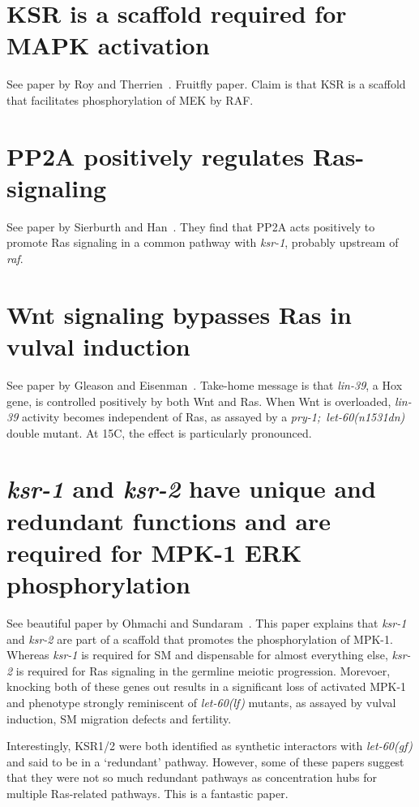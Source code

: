 \documentclass[10pt, onecolumn]{article}
\newcommand{\gene}[1]{\mbox{\emph{#1}}}
\newcommand{\letgf}{\gene{let-60(gf)}}
\newcommand{\letlf}{\gene{let-60(lf)}}
\begin{document}
\section*{KSR is a scaffold required for MAPK activation}
See paper by Roy and Therrien~\cite{}. Fruitfly paper. Claim is that KSR is a
scaffold that facilitates phosphorylation of MEK by RAF.

\section*{PP2A positively regulates Ras-signaling}
See paper by Sierburth and Han~\cite{}. They find that PP2A acts positively to
promote Ras signaling in a common pathway with \gene{ksr-1}, probably upstream
of \gene{raf}.

\section*{Wnt signaling bypasses Ras in vulval induction}
See paper by Gleason and Eisenman~\cite{}. Take-home message is that
\gene{lin-39}, a Hox gene, is controlled positively by both Wnt and Ras. When
Wnt is overloaded, \gene{lin-39} activity becomes independent of Ras, as assayed
by a \gene{pry-1; let-60(n1531dn)} double mutant. At 15\degree{}C, the effect is
particularly pronounced.

\section*{\gene{ksr-1} and \gene{ksr-2} have unique and redundant functions and
          are required for MPK-1 ERK phosphorylation}
See beautiful paper by Ohmachi and Sundaram~\cite{Ohmachi2002}. This paper explains that
\gene{ksr-1} and \gene{ksr-2} are part of a scaffold that promotes the
phosphorylation of MPK-1. Whereas \gene{ksr-1} is required for SM and dispensable
for almost everything else, \gene{ksr-2} is required for Ras signaling in the
germline meiotic progression. Morevoer, knocking both of these genes out results
in a significant loss of activated MPK-1 and phenotype strongly reminiscent of
\letlf{} mutants, as assayed by vulval induction, SM migration defects and
fertility.

Interestingly, KSR1/2 were both identified as synthetic interactors with
\letgf{} and said to be in a `redundant' pathway. However, some of these papers
suggest that they were not so much redundant pathways as concentration hubs
for multiple Ras-related pathways. This is a fantastic paper.
\end{document}
